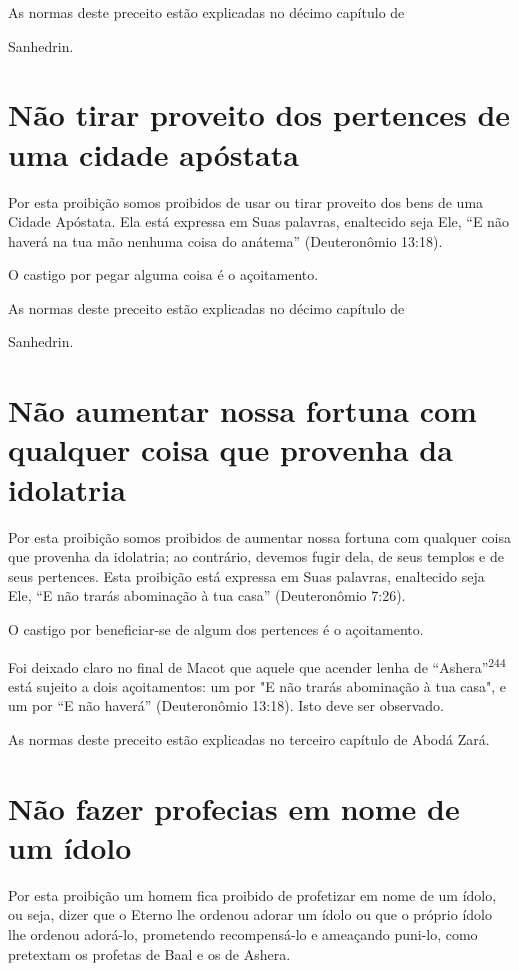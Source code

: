As normas deste preceito estão explicadas no décimo capítulo de


Sanhedrin.

\section{Não tirar proveito dos pertences de uma cidade apóstata}

Por esta proibição somos proibidos de usar ou tirar proveito dos bens de
uma Cidade Apóstata. Ela está expressa em Suas palavras, enaltecido seja
Ele, ``E não haverá na tua mão nenhuma coisa do anátema'' (Deuteronômio
13:18).

O castigo por pegar alguma coisa é o açoitamento.


As normas deste preceito estão explicadas no décimo capítulo de


Sanhedrin.

\section{Não aumentar nossa fortuna com qualquer coisa que provenha da idolatria}

Por esta proibição somos proibidos de aumentar nossa fortuna com
qualquer coisa que provenha da idolatria; ao contrário, devemos fugir
dela, de seus templos e de seus pertences. Esta proibição está expressa
em Suas palavras, enaltecido seja Ele, ``E não trarás abominação à tua casa''
(Deuteronômio 7:26).


O castigo por beneficiar-se de algum dos pertences é o açoitamento.


Foi deixado claro no final de Macot que aquele que acender lenha de
``Ashera''\textsuperscript{244} está sujeito a dois açoitamentos: um por
"E não trarás abomi­nação à tua casa", e um por ``E não haverá''
(Deuteronômio 13:18). Isto deve ser observado.

As normas deste preceito estão explicadas no terceiro capítulo de Abodá
Zará.

\section{Não fazer profecias em nome de um ídolo}

Por esta proibição um homem fica proibido de profetizar em nome de um
ídolo, ou seja, dizer que o Eterno lhe ordenou adorar um ídolo ou que o
próprio ídolo lhe ordenou adorá-lo, prometendo recompensá-lo e
ameaçan­do puni-lo, como pretextam os profetas de Baal e os de Ashera.

